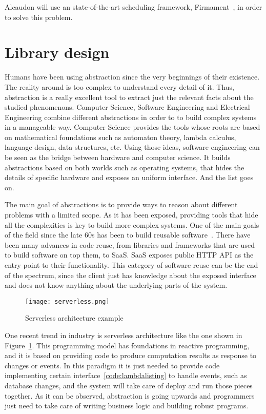 Alcaudon will use an state-of-the-art scheduling framework,
Firmament~\cite{firmament}, in order to solve this problem.

\section{Library design}

Humans have been using abstraction since the very beginnings of their existence.
The reality around is too complex to understand every detail of it. Thus,
abstraction is a really excellent tool to extract just the relevant facts about
the studied phenomenons. Computer Science, Software Engineering and Electrical
Engineering combine different abstractions in order to to build complex systems
in a manageable way.
Computer Science provides the tools whose roots are based on mathematical
foundations such as automaton theory, lambda calculus, language design, data
structures, etc.
Using those ideas, software engineering can be seen as the bridge between
hardware and computer science. It builds abstractions based on both worlds such
as operating systems, that hides the details of specific hardware and exposes an
uniform interface. And the list goes on.

The main goal of abstractions is to
provide ways to reason about different problems with a limited scope.
As it has been exposed, providing tools that hide all the complexities is key to
build more complex systems. One of the main goals of the field since the late
60s has been to build reusable software~\cite{reuse}. There have been many
advances in code reuse, from libraries and frameworks that are used to build
software on top them, to \acf{SaaS}. SaaS exposes public \ac{HTTP}
\ac{API} as the entry point to their functionality. This category of software reuse
can be the end of the spectrum, since the client just has knowledge about
the exposed interface and does not know anything about the underlying parts of the
system.

\begin{figure}[!h]
\begin{center}
\texttt{[image: serverless.png]}
\caption{Serverless architecture example~\cite{awsserverless}}
\label{fig:serverless}
\end{center}
\end{figure}

One recent trend in industry is serverless architecture like the one shown in
Figure~\ref{fig:serverless}. This programming model has foundations in reactive
programming, and it is based on providing code to produce computation results as
response to changes or events. In this paradigm it is just needed to provide
code implementing certain interface~\ref{code:lambdalisting} to handle events,
such as database changes, and the system will take care of deploy and run those
pieces together. As it can be observed, abstraction is going upwards and
programmers just need to take care of writing business logic and building
robust programs.

